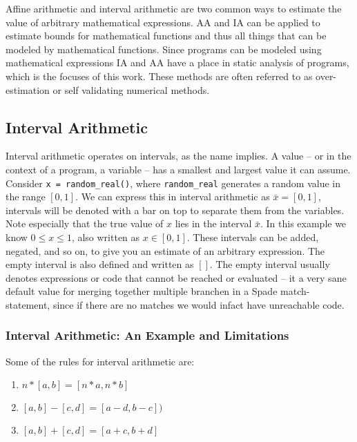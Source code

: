 Affine arithmetic and interval arithmetic are two common ways to estimate the value of arbitrary mathematical expressions. AA and IA can be applied to estimate bounds for mathematical functions and thus all things that can be modeled by mathematical functions. Since programs can be modeled using mathematical expressions IA and AA have a place in static analysis of programs, which is the focuses of this work. These methods are often referred to as over-estimation or self validating numerical methods.

\subsection{Interval Arithmetic}
Interval arithmetic operates on intervals, as the name implies. A value -- or in the context of a program, a variable -- has a smallest and largest value it can assume. Consider \verb`x = random_real()`, where \verb`random_real` generates a random value in the range $[0, 1]$. We can express this in interval arithmetic as $\bar{x} = [0, 1]$, intervals will be denoted with a bar on top to separate them from the variables. Note especially that the true value of $x$ lies in the interval $\bar{x}$. In this example we know $0 \leq x \leq 1$, also written as $x \in [0, 1]$. These intervals can be added, negated, and so on, to give you an estimate of an arbitrary expression. The empty interval is also defined and written as $[]$. The empty interval usually denotes expressions or code that cannot be reached or evaluated -- it a very sane default value for merging together multiple branchen in a Spade match-statement, since if there are no matches we would infact have unreachable code.

\subsubsection{Interval Arithmetic: An Example and Limitations}
Some of the rules for interval arithmetic are:
\begin{enumerate}
  \item $n * [a, b] = [n * a, n * b]$
  \item $[a, b] - [c, d] = [a - d, b - c])$
  \item $[a, b] + [c, d] = [a + c, b + d]$
\end{enumerate}

